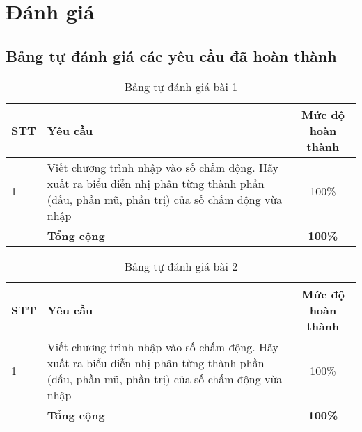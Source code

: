 \section{Đánh giá}
\subsection{Bảng tự đánh giá các yêu cầu đã hoàn thành}

\begin{center}
\begin{table}[H]
    \centering
    \caption{Bảng tự đánh giá bài 1}
    \renewcommand{\arraystretch}{1.4}
    \begin{tabular}{|l|p{}|c|}
    \hline
    \textbf{STT} & \textbf{Yêu cầu}            & \textbf{Mức độ hoàn thành} \\ \hline
    1            &  Viết chương trình nhập vào số chấm động. Hãy xuất ra biểu diễn nhị phân từng thành phần 
    (dấu, phần mũ, phần trị) của số chấm động vừa nhập       & 100\%          \\ \hline
                & \textbf{Tổng cộng}               &\textbf{100\%}           \\ \hline
    \end{tabular}
    \label{tab:mytable}
\end{table}

\begin{table}[H]
  \centering
  \caption{Bảng tự đánh giá bài 2}
  \renewcommand{\arraystretch}{1.4}
  \begin{tabular}{|l|p{}|c|}
  \hline
  \textbf{STT} & \textbf{Yêu cầu}            & \textbf{Mức độ hoàn thành} \\ \hline
  1            &  Viết chương trình nhập vào số chấm động. Hãy xuất ra biểu diễn nhị phân từng thành phần 
  (dấu, phần mũ, phần trị) của số chấm động vừa nhập       & 100\%          \\ \hline
              & \textbf{Tổng cộng}               &\textbf{100\%}           \\ \hline
  \end{tabular}
  \label{tab:mytable}
\end{table}


\end{center}
